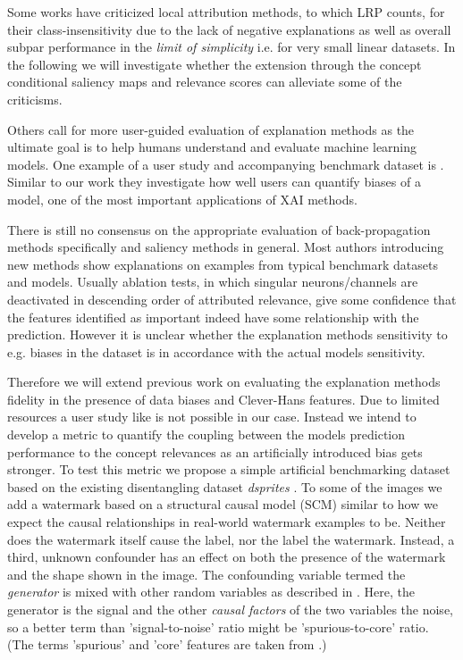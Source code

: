 Some works have criticized local attribution methods, to which LRP counts, for their class-insensitivity due to the lack of negative explanations as well as overall subpar performance in the \textit{limit of simplicity} i.e. for very small linear datasets. 
In the following we will investigate whether the extension through the concept conditional saliency maps and relevance scores can alleviate some of the criticisms.

Others call for more user-guided evaluation of explanation methods as the ultimate goal is to help humans understand and evaluate machine learning models. One example of a user study and accompanying benchmark dataset is \cite{Sixt2022}. Similar to our work they investigate how well users can quantify biases of a model, one of the most important applications of XAI methods. 

There is still no consensus on the appropriate evaluation of back-propagation methods specifically and saliency methods in general. Most authors introducing new methods show explanations on examples from typical benchmark datasets and models. Usually ablation tests, in which singular neurons/channels are deactivated in descending order of attributed relevance, give some confidence that the features identified as important indeed have some relationship with the prediction. However it is unclear whether the explanation methods sensitivity to e.g. biases in the dataset is in accordance with the actual models sensitivity. 

Therefore we will extend previous work on evaluating the explanation methods fidelity in the presence of data biases and Clever-Hans features. Due to limited resources a user study like \cite{Sixt2022} is not possible in our case. Instead we intend to develop a metric to quantify the coupling between the models prediction performance to the concept relevances as an artificially introduced bias gets stronger. To test this metric we propose a simple artificial benchmarking dataset based on the existing disentangling dataset \textit{dsprites} \cite{dsprites17}. To some of the images we add a watermark based on a structural causal model (SCM) similar to how we expect the causal relationships in real-world watermark examples to be. Neither does the watermark itself cause the label, nor the label the watermark. Instead, a third, unknown confounder has an effect on both the presence of the watermark and the shape shown in the image. The confounding variable termed the \textit{generator} is mixed with other random variables as described in \cite{Clark2023}. Here, the generator is the signal and the other \textit{causal factors} of the two variables the noise, so a better term than 'signal-to-noise' ratio might be 'spurious-to-core' ratio.
(The terms 'spurious' and 'core' features are taken from \cite{Singla2022}.) 

